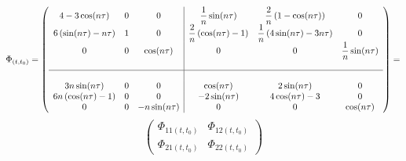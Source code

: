 \documentclass[11pt, a4paper]{article}
\begin{document}
\begin{equation*}
    \Phi_{(t,t_0)} = \left(\begin{array}{ccc|ccc}
        4-3\cos(n\tau) & 0 & 0 &\displaystyle \frac{1}{n}\sin(n\tau) &\displaystyle \frac{2}{n}\left(1-\cos(n\tau)\right) & 0 \\ 
        6\left(\sin(n\tau)-n\tau\right) & 1 & 0 &\displaystyle \frac{2}{n}\left(\cos(n\tau)-1\right) &\displaystyle \frac{1}{n}\left(4\sin(n\tau)-3n\tau\right) & 0 \\ 0 & 0 & \cos(n\tau) & 0 & 0 & \displaystyle\frac{1}{n}\sin(n\tau) \\ &&& \\ \hline &&& \\
        3n\sin(n\tau) & 0 & 0 & \cos(n\tau) & 2\sin(n\tau) & 0 \\
        6n\left(\cos(n\tau)-1\right) & 0 & 0 & -2\sin(n\tau) & 4\cos(n\tau)-3 & 0 \\
        0 & 0 & -n\sin(n\tau) & 0 & 0 & \cos(n\tau) 
    \end{array}\right) =  
\end{equation*}
\begin{equation}
    \begin{pmatrix}
        \Phi_{11(t,t_0)} & \Phi_{12(t,t_0)} \\
        \Phi_{21(t,t_0)} & \Phi_{22(t,t_0)}
    \end{pmatrix} 
\end{equation}
\newpage
\end{document}
